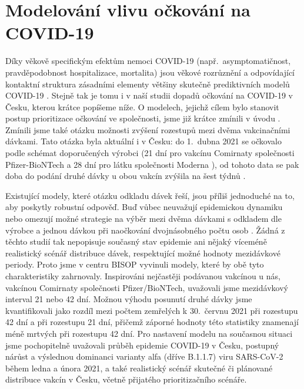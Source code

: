 \section*{Modelování vlivu očkování na COVID-19}

Díky věkově specifickým efektům nemoci COVID-19 (např.\ asymptomatičnost, pravděpodobnost hospitalizace, mortalita) jsou věkové rozrůznění a odpovídající kontaktní struktura zásadními elementy většiny skutečně prediktivních modelů COVID-19 \cite[a mnoho dalších]{Davies_etal2020,Bubar_etal2021,Moore_etal2021,Rozhnova_etal2021}. Stejně tak je tomu i v naší studii dopadů očkování na COVID-19 v Česku, kterou krátce popíšeme níže. O modelech, jejichž cílem bylo stanovit postup prioritizace očkování ve společnosti, jsme již krátce zmínili v úvodu \cite{Bubar_etal2021,Moore_etal2021b}. Zmínili jsme také otázku možnosti zvýšení rozestupů mezi dvěma vakcinačními dávkami. Tato otázka byla aktuální i v Česku: do 1.\ dubna 2021 se očkovalo podle schémat doporučených výrobci (21 dní pro vakcínu Comirnaty společnosti Pfizer-BioNTech a 28 dní pro látku společnosti Moderna \cite{original_delay}), od tohoto data se pak doba do podání druhé dávky u obou vakcín zvýšila na šest týdnů \cite{new_delay}.

Existující modely, které otázku odkladu dávek řeší, jsou příliš jednoduché na to, aby poskytly robustní odpověď. Buď vůbec neuvažují epidemickou dynamiku \cite{Tuite_etal2021} nebo omezují možné strategie na výběr mezi dvěma dávkami s odkladem dle výrobce a jednou dávkou při naočkování dvojnásobného počtu osob \cite{Paltiel_etal2021}. Žádná z těchto studií tak nepopisuje současný stav epidemie ani nějaký víceméně realistický scénář distribuce dávek, respektující možné hodnoty mezidávkové periody. Proto jsme v centru BISOP vyvinuli modely, které by obě tyto charakteristiky zahrnovaly. Inspirováni nejčastěji podávanou vakcínou u nás, vakcínou Comirnaty společnosti Pfizer/BioNTech, uvažovali jsme mezidávkový interval 21 nebo 42 dní. Možnou výhodu posunutí druhé dávky jsme kvantifikovali jako rozdíl mezi počtem zemřelých k 30.\ červnu 2021 při rozestupu 42 dní a při rozestupu 21 dní, přičemž záporné hodnoty této statistiky znamenají méně mrtvých při rozestupu 42 dní. Pro nastavení modelu na současnou situaci jsme pochopitelně uvažovali průběh epidemie COVID-19 v Česku, postupný nárůst a výslednou dominanci varianty alfa (dříve B.1.1.7) viru SARS-CoV-2 během ledna a února 2021, a také realistický scénář skutečné či plánované distribuce vakcín v Česku, včetně přijatého prioritizačního scénáře. 

